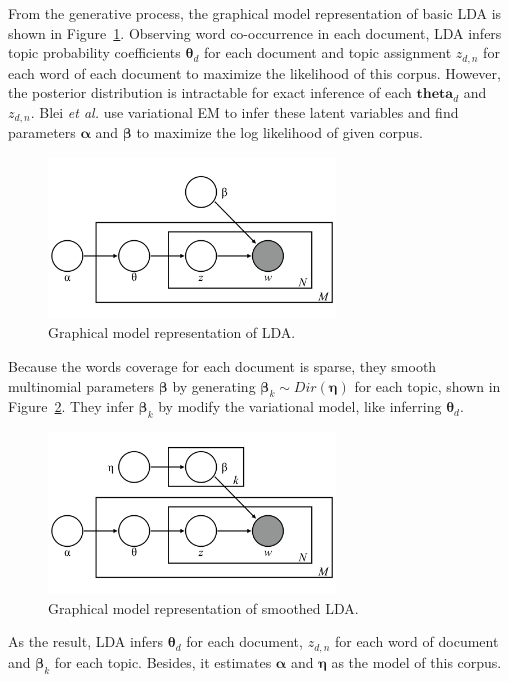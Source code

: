 From the generative process, the graphical model representation of basic LDA is shown in Figure~\ref{fig:LDA_model}. Observing word co-occurrence in each document, LDA infers topic probability coefficients $\boldsymbol{\theta}_d$ for each document and topic assignment $z_{d,n}$ for each word of each document to maximize the likelihood of this corpus. However, the posterior distribution is intractable for exact inference of each $\boldsymbol{theta}_d$ and $z_{d,n}$. Blei {\it et al.} use variational EM to infer these latent variables and find parameters $\boldsymbol{\alpha}$ and $\boldsymbol{\beta}$ to maximize the log likelihood of given corpus.

\begin{figure}[!t]
\centering
\includegraphics[width=3in]{fig/LDA_model.png}
\caption{Graphical model representation of LDA.}
\label{fig:LDA_model}
\end{figure}

Because the words coverage for each document is sparse, they smooth multinomial parameters $\boldsymbol{\beta}$ by generating $\boldsymbol{\beta}_k \sim Dir(\boldsymbol{\eta})$ for each topic, shown in Figure~\ref{fig:LDA_model2}. They infer $\boldsymbol{\beta}_k$ by modify the variational model, like inferring $\boldsymbol{\theta}_d$.

\begin{figure}[!t]
\centering
\includegraphics[width=3in]{fig/LDA_model2.png}
\caption{Graphical model representation of smoothed LDA.}
\label{fig:LDA_model2}
\end{figure}

As the result, LDA infers $\boldsymbol{\theta}_d$ for each document, $z_{d,n}$ for each word of document and $\boldsymbol{\beta}_k$ for each topic. Besides, it estimates $\boldsymbol{\alpha}$ and $\boldsymbol{\eta}$ as the model of this corpus.

